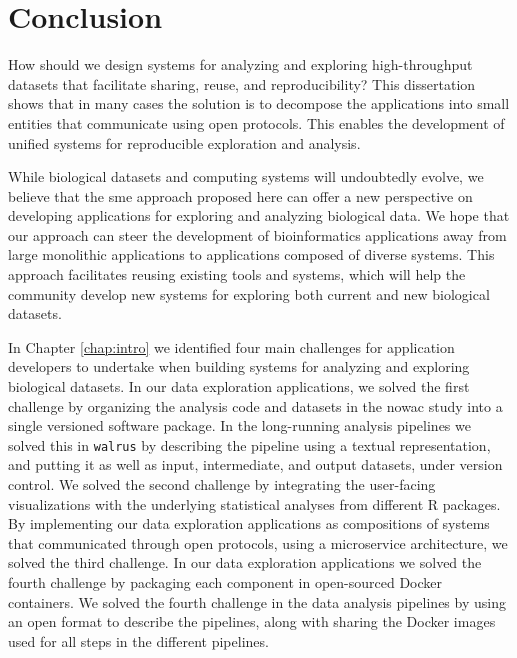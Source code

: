 \chapter{Conclusion}
How should we design systems for analyzing and exploring high-throughput
datasets that facilitate sharing, reuse, and reproducibility? This dissertation
shows that in many cases the solution is to decompose the applications into
small entities that communicate using open protocols. This enables the
development of unified systems for reproducible exploration and analysis. 

While biological datasets and computing systems will undoubtedly evolve, we
believe that the \gls{sme} approach proposed here can offer a new perspective on
developing applications for exploring and analyzing biological data. We hope
that our approach can steer the development of bioinformatics applications away
from large monolithic applications to applications composed of diverse systems.
This approach facilitates reusing existing tools and systems, which will help
the community develop new systems for exploring both current and new biological
datasets. 

In Chapter \ref{chap:intro} we identified four main challenges for application
developers to undertake when building systems for analyzing and exploring
biological datasets. In our data exploration applications, we solved the first
challenge by organizing the analysis code and datasets in the \gls{nowac} study
into a single versioned software package. In the long-running analysis pipelines
we solved this in \texttt{walrus} by describing the pipeline using a textual
representation, and putting it as well as input, intermediate, and output
datasets, under version control. We solved the second challenge by integrating
the user-facing visualizations with the underlying statistical analyses from
different R packages. By implementing our data exploration applications as
compositions of systems that communicated through open protocols, using a
microservice architecture, we solved the third challenge.  In our data
exploration applications we solved the fourth challenge by packaging each
component in open-sourced Docker containers. We solved the fourth challenge in
the data analysis pipelines by using an open format to describe the pipelines,
along with sharing the Docker images used for all steps in the different
pipelines.

